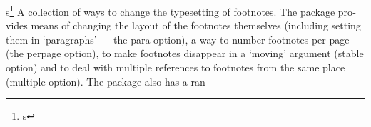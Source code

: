 \documentclass[11pt,a4paper]{book}
\begin{document}
\beginnumbering
\pstart
s\footnote{s}
A col­lec­tion of ways to change the type­set­ting of foot­notes. The pack­age pro­vides means of chang­ing the lay­out of the foot­notes them­selves (in­clud­ing set­ting them in ‘para­graphs’ — the para op­tion), a way to num­ber foot­notes per page (the per­page op­tion), to make foot­notes dis­ap­pear in a ‘mov­ing’ ar­gu­ment (sta­ble op­tion) and to deal with mul­ti­ple ref­er­ences to foot­notes from the same place (mul­ti­ple op­tion). The pack­age also has a ran
\pend
\endnumbering
\end{document}
